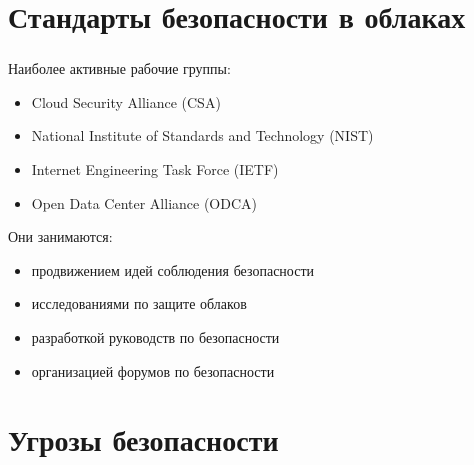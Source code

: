 
\frame[plain]{\titlepage} %


\section{Стандарты безопасности в облаках}

\begin{frame}
\frametitle{\insertsection}

Наиболее активные рабочие группы:
\begin{itemize}
    \item Cloud Security Alliance (CSA)
    \item National Institute of Standards and Technology (NIST)
    \item Internet Engineering Task Force (IETF)
    \item Open Data Center Alliance (ODCA)
\end{itemize}

\vspace{\baselineskip}

Они занимаются:
\begin{itemize}
    \item продвижением идей соблюдения безопасности
    \item исследованиями по защите облаков
    \item разработкой руководств по безопасности
    \item организацией форумов по безопасности
\end{itemize}
\end{frame}


\section{Угрозы безопасности}

